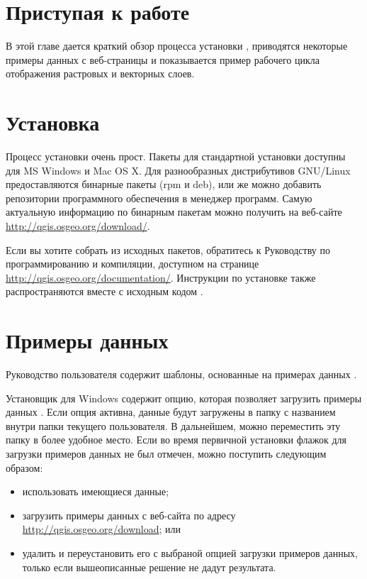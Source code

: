 
\section{Приступая к работе}\label{label_getstarted}


В этой главе дается краткий обзор процесса установки \qg, приводятся
некоторые примеры данных с веб-страницы \qg и показывается пример
рабочего цикла отображения растровых и векторных слоев.

\section{Установка}\label{label_installation}

Процесс установки \qg очень прост. Пакеты для стандартной установки
доступны для MS Windows и Mac OS X. Для разнообразных дистрибутивов
GNU/Linux предоставляются бинарные пакеты (rpm и deb), или же можно
добавить репозитории программного обеспечения в менеджер программ. Самую
актуальную информацию по бинарным пакетам можно получить на веб-сайте
\qg \url{http://qgis.osgeo.org/download/}.


Если вы хотите собрать \qg из исходных пакетов, обратитесь к Руководству
по программированию и компиляции, доступном на странице
\url{http://qgis.osgeo.org/documentation/}. Инструкции по установке
также распространяются вместе с исходным кодом \qg.

\section{Примеры данных}\label{label_sampledata}

Руководство пользователя содержит шаблоны, основанные на примерах данных
\qg.

\win Установщик для Windows содержит опцию, которая позволяет загрузить
примеры данных \qg. Если опция активна, данные будут загружены в папку
с названием  внутри папки 
текущего пользователя. В дальнейшем, можно переместить эту папку в более
удобное место. Если во время первичной установки \qg флажок для загрузки
примеров данных не был отмечен, можно поступить следующим образом:
\begin{itemize}[label=--]
\item использовать имеющиеся данные;
\item загрузить примеры данных с веб-сайта \qg по адресу
\url{http://qgis.osgeo.org/download}; или
\item удалить \qg и переустановить его с выбраной опцией загрузки
примеров данных, только если вышеописанные решение не дадут результата.
\end{itemize}


